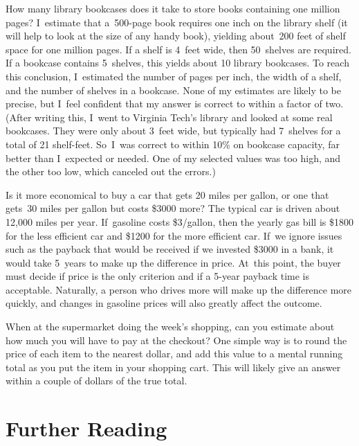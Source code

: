 \begin{example}
How many library bookcases does it take to store books containing one
million pages?
I~estimate that a~500-page book requires one inch on the
library shelf (it will help to look at the size of any handy book),
yielding about~200 feet of shelf space for one million pages.
If a shelf is 4~feet wide, then 50~shelves are required.
If a bookcase contains 5~shelves, this yields about 10 library
bookcases.
To reach this conclusion, I~estimated the number of pages per
inch, the width of a shelf, and the number of shelves in a
bookcase.
None of my estimates are likely to be precise, but I~feel confident
that my answer is correct to within a factor of two.
(After writing this, I~went to Virginia Tech's library and looked at
some real bookcases.
They were only about 3~feet wide, but typically had 7~shelves for a
total of 21 shelf-feet.
So~I~was correct to within 10\% on bookcase capacity, far better than
I~expected or needed.
One of my selected values was too high, and the other too low, which
canceled out the errors.)
\end{example}

\begin{example}
Is it more economical
to buy a car that gets 20 miles per gallon, or one that gets~30 miles
per gallon but costs \$3000 more?
The typical car is driven about 12,000 miles per year.
If~gasoline costs \$3/gallon, then the yearly gas bill is
\$1800 for the less efficient car and \$1200 for the more efficient car.
If~we ignore issues such as the payback that would be received if we
invested \$3000 in a bank, it would take 5~years to make up the
difference in price.
At~this point, the buyer must decide if price is the only criterion and
if a 5-year payback time is acceptable.
Naturally, a person who drives more will make up the difference more
quickly, and changes in gasoline prices will also greatly affect the
outcome. 
\end{example}

\begin{example}
When at the supermarket doing the week's shopping, can you estimate
about how much you will have to pay at the checkout?
One simple way is to round the price of each item to the nearest
dollar, and add this value to a mental running total as you put the
item in your shopping cart.
This will likely give an answer within a couple of dollars of the true
total.
\end{example}

\section{Further Reading}

